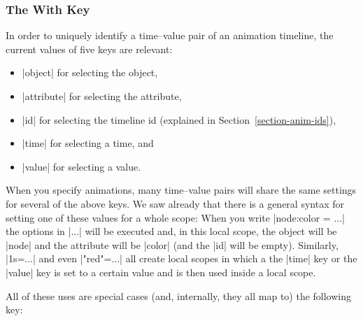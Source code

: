 \subsubsection{The With Key}

In order to uniquely identify a time--value pair of an animation
timeline, the current values of five keys are relevant:
\begin{itemize}
\item |object| for selecting the object,
\item |attribute| for selecting the attribute,
\item |id| for selecting the timeline id (explained in
  Section~\ref{section-anim-ids}),
\item |time| for selecting a time, and
\item |value| for selecting a value.
\end{itemize}

When you specify animations, many time--value pairs will share the
same settings for several of the above keys. We saw already that there
is a general syntax for setting one of these values for a whole scope:
When you write |node:color = {...}| the options in |...| will be
executed and, in this local scope, the object will be |node| and the
attribute will be |color| (and the |id| will be empty). Similarly,
|1s={...}| and even |"red"={...}| all create local scopes in which a
the |time| key or the |value| key is set to a certain value and is
then used inside a local scope.

All of these uses are special cases (and, internally, they all map to)
the following key:

